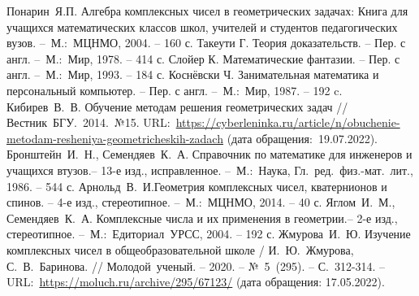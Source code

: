 \renewcommand\bibname{Список литературы}
\begin{thebibliography}{00}
    Понарин~Я.П. Алгебра комплексных чисел в геометрических задачах:
   Книга для учащихся математических классов школ, учителей и студентов педагогических вузов. --~М.:~МЦНМО,
   2004. -- 160 с.
    Такеути Г. Теория доказательств. -- Пер. с англ. --~М.:~Мир, 1978. -- 414 с.
    Слойер К. Математические фантазии. -- Пер. с англ. --~М.:~Мир, 1993. -- 184 с.
    Коснёвски Ч. Занимательная математика и персональный компьютер. -- Пер. с англ. --~М.:~Мир, 1987. -- 192 c.
    Кибирев~В.~В. Обучение методам решения геометрических задач // Вестник~БГУ.~2014.~№15. URL:~\href{https://cyberleninka.ru/article/n/obuchenie-metodam-resheniya-geometricheskih-zadach}{https://cyberleninka.ru/article/n/obuchenie-metodam-resheniya-geometricheskih-zadach} (дата обращения:~19.07.2022).
    Бронштейн~И.~Н., Семендяев~К.~А. Справочник по математике для инженеров и учащихся втузов.-- 13-е изд., исправленное. --~М.:~Наука, Гл.~ред.~физ.-мат.~лит., 1986. -- 544 с.
    Арнольд~В.~И.Геометрия комплексных чисел, кватернионов и спинов. -- 4-е изд., стереотипное. --~М.:~МЦНМО, 2014. -- 40 с.
    Яглом~И.~М., Семендяев~К.~А. Комплексные числа и их применения в геометрии.-- 2-е изд., стереотипное. --~М.:~Едиториал~УРСС, 2004. -- 192 с.
    Жмурова~И.~Ю. Изучение комплексных чисел в общеобразовательной школе / И.~Ю.~Жмурова, С.~В.~Баринова. // Молодой~ученый. -- 2020. -- №~5~(295). -- С.~312-314. -- URL:~\href{https://moluch.ru/archive/295/67123/}{https://moluch.ru/archive/295/67123/} (дата обращения: 17.05.2022).
\end{thebibliography}
